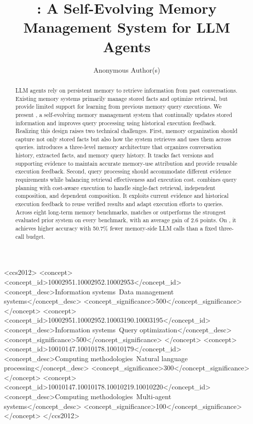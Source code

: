 \documentclass[sigconf, anonymous, review, nonacm]{acmart}
\begin{document}
\flushbottom

\title{\sys{}: A Self-Evolving Memory Management System for LLM Agents}

\author{Anonymous Author(s)}

\renewcommand{\shortauthors}{Anonymous Author(s)}

\begin{abstract}
LLM agents rely on persistent memory to retrieve information from past conversations. Existing memory systems primarily manage stored facts and optimize retrieval, but provide limited support for learning from previous memory query executions.
We present \sys{}, a self-evolving memory management system that continually updates stored information and improves query processing using historical execution feedback.
Realizing this design raises two technical challenges.
First, memory organization should capture not only stored facts but also how the system retrieves and uses them across queries.
\sys introduces a three-level memory architecture that organizes conversation history, extracted facts, and memory query history. It tracks fact versions and supporting evidence to maintain accurate memory-use attribution and provide reusable execution feedback.
Second, query processing should accommodate different evidence requirements while balancing retrieval effectiveness and execution cost. \sys combines query planning with cost-aware execution to handle single-fact retrieval, independent composition, and dependent composition. It exploits current evidence and historical execution feedback to reuse verified results and adapt execution efforts to queries.
Across eight long-term memory benchmarks, \sys matches or outperforms the strongest evaluated prior system on every benchmark, with an average gain of 2.6 points. On \membench{}, it achieves higher accuracy with 50.7\% fewer memory-side LLM calls than a fixed three-call budget.
\end{abstract}

\iffalse %
\begin{CCSXML}
<ccs2012>
   <concept>
       <concept_id>10002951.10002952.10002953</concept_id>
       <concept_desc>Information systems~Data management systems</concept_desc>
       <concept_significance>500</concept_significance>
       </concept>
   <concept>
       <concept_id>10002951.10002952.10003190.10003195</concept_id>
       <concept_desc>Information systems~Query optimization</concept_desc>
       <concept_significance>500</concept_significance>
       </concept>
   <concept>
       <concept_id>10010147.10010178.10010179</concept_id>
       <concept_desc>Computing methodologies~Natural language processing</concept_desc>
       <concept_significance>300</concept_significance>
       </concept>
   <concept>
       <concept_id>10010147.10010178.10010219.10010220</concept_id>
       <concept_desc>Computing methodologies~Multi-agent systems</concept_desc>
       <concept_significance>100</concept_significance>
       </concept>
 </ccs2012>
\end{CCSXML}
\end{document}
